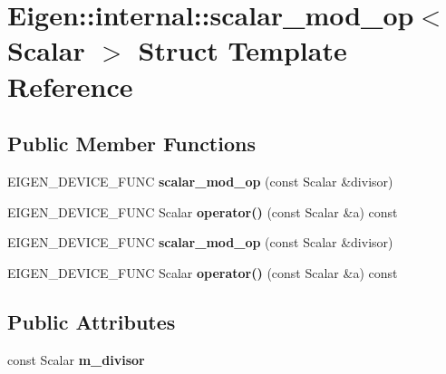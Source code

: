 \hypertarget{struct_eigen_1_1internal_1_1scalar__mod__op}{}\section{Eigen\+:\+:internal\+:\+:scalar\+\_\+mod\+\_\+op$<$ Scalar $>$ Struct Template Reference}
\label{struct_eigen_1_1internal_1_1scalar__mod__op}
\subsection*{Public Member Functions}
\begin{DoxyCompactItemize}
\item 
\mbox{\label{struct_eigen_1_1internal_1_1scalar__mod__op_ace3524064fc3f8cf41689c7c7af72de5}} 
E\+I\+G\+E\+N\+\_\+\+D\+E\+V\+I\+C\+E\+\_\+\+F\+U\+NC {\bfseries scalar\+\_\+mod\+\_\+op} (const Scalar \&divisor)
\item 
\mbox{\label{struct_eigen_1_1internal_1_1scalar__mod__op_a341e786e1ca8fa497877a6e96b71e129}} 
E\+I\+G\+E\+N\+\_\+\+D\+E\+V\+I\+C\+E\+\_\+\+F\+U\+NC Scalar {\bfseries operator()} (const Scalar \&a) const
\item 
\mbox{\label{struct_eigen_1_1internal_1_1scalar__mod__op_ace3524064fc3f8cf41689c7c7af72de5}} 
E\+I\+G\+E\+N\+\_\+\+D\+E\+V\+I\+C\+E\+\_\+\+F\+U\+NC {\bfseries scalar\+\_\+mod\+\_\+op} (const Scalar \&divisor)
\item 
\mbox{\label{struct_eigen_1_1internal_1_1scalar__mod__op_a341e786e1ca8fa497877a6e96b71e129}} 
E\+I\+G\+E\+N\+\_\+\+D\+E\+V\+I\+C\+E\+\_\+\+F\+U\+NC Scalar {\bfseries operator()} (const Scalar \&a) const
\end{DoxyCompactItemize}
\subsection*{Public Attributes}
\begin{DoxyCompactItemize}
\item 
\mbox{\label{struct_eigen_1_1internal_1_1scalar__mod__op_ad5977d5b4b6b3af1992d846befd800eb}} 
const Scalar {\bfseries m\+\_\+divisor}
\end{DoxyCompactItemize}


